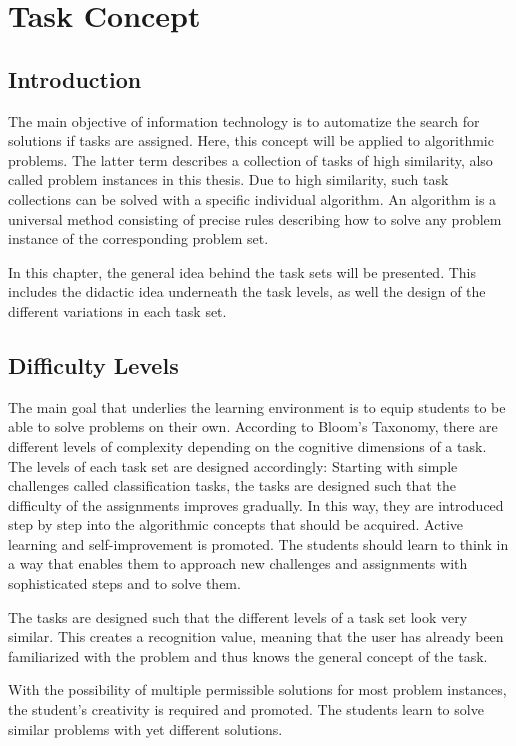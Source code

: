 \chapter{Task Concept}
\label{chapter:concept}

\section{Introduction}
\label{section:introduction}
The main objective of information technology is to automatize the search for solutions if tasks are assigned. Here, this concept will be applied to algorithmic problems. The latter term describes a collection of tasks of high similarity, also called problem instances in this thesis. Due to high similarity, such task collections can be solved with a specific individual algorithm. An algorithm is a universal method consisting of precise rules describing how to solve any problem instance of the corresponding problem set.

In this chapter, the general idea behind the task sets will be presented. This includes the didactic idea underneath the task levels, as well the design of the different variations in each task set.

\section{Difficulty Levels}
\label{section:levels}

The main goal that underlies the learning environment is to equip students to be able to solve problems on their own. According to Bloom's Taxonomy, there are different levels of complexity depending on the cognitive dimensions of a task. The levels of each task set are designed accordingly: Starting with simple challenges called classification tasks, the tasks are designed such that the difficulty of the assignments improves gradually. In this way, they are introduced step by step into the algorithmic concepts that should be acquired. Active learning and self-improvement is promoted. The students should learn to think in a way that enables them to approach new challenges and assignments with sophisticated steps and to solve them.

The tasks are designed such that the different levels of a task set look very similar. This creates a recognition value, meaning that the user has already been familiarized with the problem and thus knows the general concept of the task. 

With the possibility of multiple permissible solutions for most problem instances, the student's creativity is required and promoted. The students learn to solve similar problems with yet different solutions.

